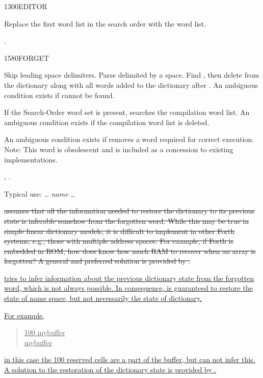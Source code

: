 \begin{worddef}{1300}{EDITOR}
\item \stack{}{}

	Replace the first word list in the search order with the
	 word list.

\see {}.
\end{worddef}


\begin{worddef}{1580}{FORGET}
\item {}

	Skip leading space delimiters. Parse  delimited by a
	space. Find , then delete  from the
	dictionary along with all words added to the dictionary after
	. An ambiguous condition exists if  cannot
	be found.

	If the Search-Order word set is present,  searches
	the compilation word list. An ambiguous condition exists if the
	compilation word list is deleted.

	An ambiguous condition exists if  removes a word
	required for correct execution. Note: This word is obsolescent
	and is included as a concession to existing implementations.

\see {},
	.

	\begin{rationale} %
		Typical use:
			{\ldots}  \emph{name} {\ldots}

\cbstart{}
\sout{%
		 assumes that all the information needed to
		restore the dictionary to its previous state is inferable
		somehow from the forgotten word. While this may be true in
		simple linear dictionary models, it is difficult to implement
		in other Forth systems; e.g., those with multiple address
		spaces. For example, if Forth is embedded in ROM, how does
		 know how much RAM to recover when an array
		is forgotten? A general and preferred solution is provided by
		.}

	\uline{%
		 tries to infer information about the previous dictionary
		state from the forgotten word, which is not always possible.  In
		consequence,  is guaranteed to restore the state of name
		space, but not necessarily the state of dictionary.}

	\uline{For example,}
		\begin{quote}
			\uline{  100    mybuffer} \\
			\uline{ mybuffer}
		\end{quote}
		\uline{in this case the 100 reserved cells are a part of the buffer,
		but  can not infer this.  A solution to the restoration
		of the dictionary state is provided by .}


\end{rationale}
\end{worddef}
